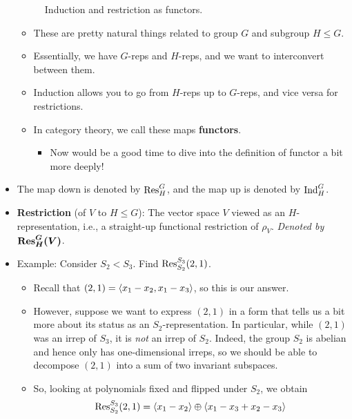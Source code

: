 \documentclass[../notes.tex]{subfiles}
\begin{document}
\begin{itemize}
\begin{figure}[h!]
        \caption{Induction and restriction as functors.}
        \label{fig:induceFunctor}
    \end{figure}
    \begin{itemize}
        \item These are pretty natural things related to group $G$ and subgroup $H\leq G$.
        \item Essentially, we have $G$-reps and $H$-reps, and we want to interconvert between them.
        \item Induction allows you to go from $H$-reps up to $G$-reps, and vice versa for restrictions.
        \item In category theory, we call these maps \textbf{functors}.
        \begin{itemize}
            \item Now would be a good time to dive into the definition of functor a bit more deeply!
        \end{itemize}
    \end{itemize}
    \item The map down is denoted by $\operatorname{Res}_H^G$, and the map up is denoted by $\operatorname{Ind}_H^G$.
    \item \textbf{Restriction} (of $V$ to $H\leq G$): The vector space $V$ viewed as an $H$-representation, i.e., a straight-up functional restriction of $\rho_V$. \emph{Denoted by} $\bm{\res_H^G(V)}$.
    \item Example: Consider $S_2<S_3$. Find $\operatorname{Res}_{S_2}^{S_3}(2,1)$.
    \begin{itemize}
        \item Recall that $(2,1)=\left\langle{x_1-x_2,x_1-x_3}\right\rangle$, so this is our answer.
        \item However, suppose we want to express $(2,1)$ in a form that tells us a bit more about its status as an $S_2$-representation. In particular, while $(2,1)$ was an irrep of $S_3$, it is \emph{not} an irrep of $S_2$. Indeed, the group $S_2$ is abelian and hence only has one-dimensional irreps, so we should be able to decompose $(2,1)$ into a sum of two invariant subspaces.
        \item So, looking at polynomials fixed and flipped under $S_2$, we obtain
        \begin{equation*}
            \res_{S_2}^{S_3}(2,1) = \inp{x_1-x_2}\oplus\inp{x_1-x_3+x_2-x_3}

\end{equation*}
\end{itemize}
\end{itemize}
\end{document}
